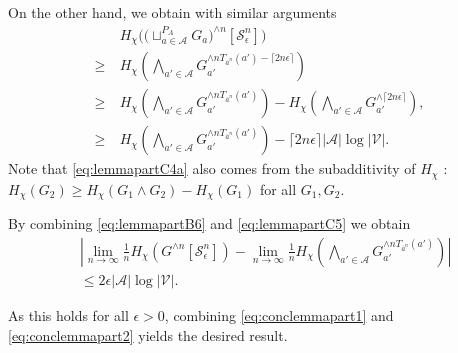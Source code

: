 \documentclass[conference,a4paper]{IEEEtran}
\begin{document}
On the other hand, we obtain with similar arguments
\begin{align}
    & H_\chi\Big(\big({\sqcup}^{P_A}_{a \in \mathcal{A}} G_a\big)^{\wedge n}[\mathcal{S}^n_\epsilon]\Big) \nonumber\\
    \geq \: & H_\chi\left(\bigwedge_{a' \in \mathcal{A}} G_{a'}^{\wedge n T_{\overline{a}^n}(a') - \lceil 2 n\epsilon \rceil}\right)\label{eq:lemmapartC3}\\
    \geq \: & H_\chi\left(\bigwedge_{a' \in \mathcal{A}} G_{a'}^{\wedge n T_{\overline{a}^n}(a')}\right) - H_\chi\left(\bigwedge_{a' \in \mathcal{A}} G_{a'}^{\wedge \lceil 2 n\epsilon\rceil}\right),\label{eq:lemmapartC4a}\\
    \geq \: & H_\chi\left(\bigwedge_{a' \in \mathcal{A}} G_{a'}^{\wedge n T_{\overline{a}^n}(a')}\right) - \lceil 2 n\epsilon \rceil|\mathcal{A}|\log|\mathcal{V}|.\label{eq:lemmapartC5}
\end{align}
Note that \eqref{eq:lemmapartC4a} also comes from the subadditivity of $H_\chi$ : $H_\chi(G_2) \geq H_\chi(G_1 \wedge G_2) - H_\chi(G_1)$ for all $G_1, G_2$.

By combining \eqref{eq:lemmapartB6} and \eqref{eq:lemmapartC5} we obtain
\begin{align}
    & \left|\lim_{n \rightarrow \infty} \frac{1}{n} H_\chi(G^{\wedge n}[\mathcal{S}^n_\epsilon]) - \lim_{n \rightarrow \infty} \frac{1}{n} H_\chi\left(\bigwedge_{a' \in \mathcal{A}} G_{a'}^{\wedge n T_{\overline{a}^n}(a')}\right)\right| \nonumber \\
    & \leq 2\epsilon|\mathcal{A}|\log|\mathcal{V}|.\label{eq:conclemmapart2}
\end{align}

As this holds for all $\epsilon > 0$, combining \eqref{eq:conclemmapart1} and \eqref{eq:conclemmapart2} yields the desired result.
\fi
\end{document}
